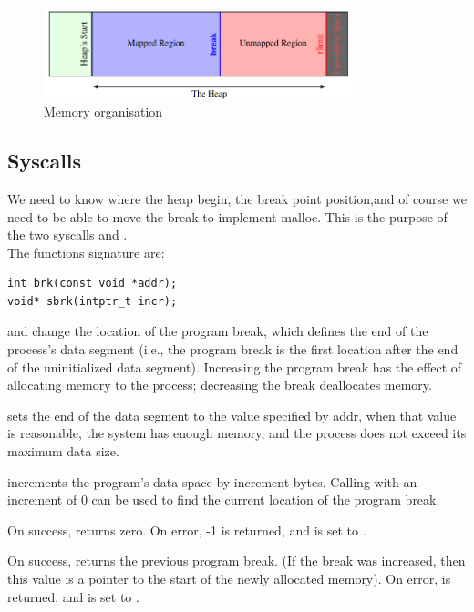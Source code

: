 \begin{figure}[htpb]
    \begin{center}
        \includegraphics[width=0.8\textwidth]{figures/heap}
    \caption{Memory organisation}
    \label{default}
    \end{center}
\end{figure}

\subsection{Syscalls}
We need to know where the heap begin, the break point position,and of course we need to be able to move the break to implement malloc. This is the purpose of the two syscalls  and .\\

The functions signature are:
\begin{lstlisting}
int brk(const void *addr);
void* sbrk(intptr_t incr);
\end{lstlisting}

 and  change the location of the program break, which defines the end of the process's data segment (i.e., the program break is the first location after the end of the uninitialized data segment). Increasing the program break has the effect of allocating memory to the process; decreasing the break deallocates memory.

 sets the end of the data segment to the value specified by addr, when that value is reasonable, the system has enough memory, and the process does not exceed its maximum data size.

 increments the program's data space by increment bytes. Calling  with an increment of 0 can be used to find the current location of the program break.

On success,  returns zero. On error, -1 is returned, and  is set to .

On success,  returns the previous program break. (If the break was increased, then this value is a pointer to the start of the newly allocated memory). On error,  is returned, and  is set to .\\

